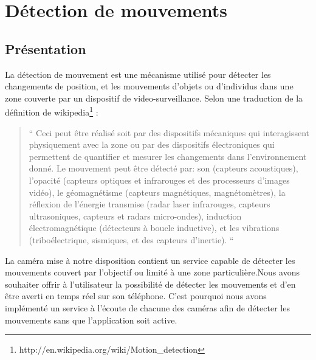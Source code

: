 \section{Détection de mouvements}
\subsection{Présentation}
La détection de mouvement est une mécanisme utilisé pour détecter les
changements de position, et les mouvements d'objets ou d'individus dans une
zone couverte par un dispositif de video-surveillance.\newline
Selon une traduction de la définition de wikipedia\footnote{\label{MotionDetection}
http://en.wikipedia.org/wiki/Motion\_detection} : \newline
\begin{quotation}
`` Ceci peut être réalisé soit par des dispositifs mécaniques qui interagissent
physiquement avec la zone ou par des dispositifs électroniques qui permettent de
quantifier et mesurer les changements dans l'environnement donné.
Le mouvement peut être détecté par: son (capteurs acoustiques), l'opacité
(capteurs optiques et infrarouges et des processeurs d'images vidéo), le
géomagnétisme (capteurs magnétiques, magnétomètres), la réflexion de l'énergie
transmise (radar laser infrarouges, capteurs ultrasoniques, capteurs et radars
micro-ondes), induction électromagnétique (détecteurs à boucle inductive), et
les vibrations (triboélectrique, sismiques, et des capteurs d'inertie). ``
\end{quotation}
\indent La caméra mise à notre disposition contient un service capable de
détecter les mouvements couvert par l'objectif ou limité à une zone
particulière.\newline Nous avons souhaiter offrir à l'utilisateur la possibilité
de détecter les mouvements et d'en être averti en temps réel sur son téléphone.
C'est pourquoi nous avons implémenté un service à l'écoute de chacune des
caméras afin de détecter les mouvements sans que l'application soit active.
